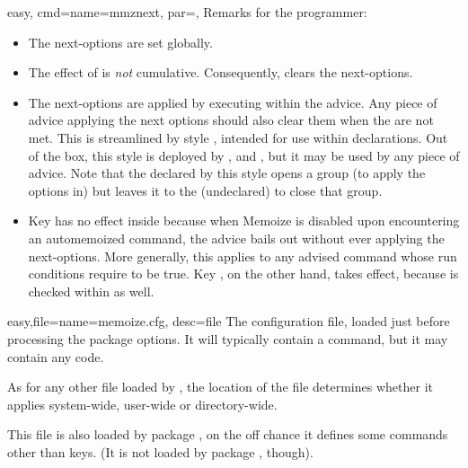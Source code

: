 \documentclass[a4paper,11pt]{article}
\begin{document}
\begin{doc}{easy,
    cmd={name=mmznext, par=},
  }
  Remarks for the programmer:
  \begin{itemize}
  \item The next-options are set globally.
  \item The effect of  is \emph{not} cumulative.  Consequently,
    \braces{} clears the next-options.
  \item The next-options are applied by executing  within
    the advice.  Any piece of advice applying the next options should also clear them
    when the  are not met.  This is streamlined by
    style , intended for use within 
    declarations.  Out of the box, this style is deployed by
    ,  and , but it
    may be used by any piece of advice.  Note that the 
    declared by this style opens a group (to apply the options in) but leaves
    it to the (undeclared)  to close that group.
  \item Key  has no effect inside  because when
    Memoize is disabled upon encountering an automemoized command, the advice
    bails out without ever applying the next-options.  More generally, this
    applies to any advised command whose run conditions require
     to be true.  Key , on the other hand,
    takes effect, because  is checked within 
    as well.
  \end{itemize}
\end{doc}

\begin{doc}{easy,file={name=memoize.cfg, desc=file}}
  The configuration file, loaded just before processing the package options.
  It will typically contain a  command, but it may contain any
   code.

  As for any other file loaded by , the location of the file
  determines whether it applies system-wide, user-wide or directory-wide.

  This file is also loaded by package , on the off chance it
  defines some commands other than  keys.  (It is not loaded
  by package , though).
\end{doc}
\end{document}
